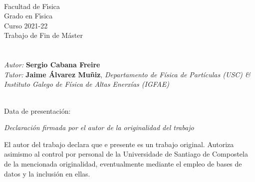 \documentclass[12 pt, a4paper]{article} %
\numberwithin{equation}{section}
\numberwithin{figure}{section}
\begin{document}
	
	
	\mbox{}
	\mbox{}\hfill{\large \DataDefensa} \vspace{1cm}
	\begin{center}
	\end{center}
	
	
	\clearpage
	\mbox{}
	\clearpage %
	
	
	\mbox{}\\
	Facultad de F\'{\i}sica\\
	Grado en F\'{\i}sica \\  
	Curso 2021-22\\%
	{\sc Trabajo de Fin de Máster}\vspace{3cm}\\
	{\sc\LARGE \TituloDoTraballo}\vspace{1cm}\\
	{\sl\large \EspecialidadeMaster}\vspace{2cm}\\
	{\sl Autor:} {\bf Sergio Cabana Freire}\\ %
	{\sl Tutor:} {\bf Jaime Álvarez Muñiz}, {\sl Departamento de Física de Partículas (USC) \& Instituto Galego de Física de Altas Enerxías (IGFAE)}\\
	\vspace{1cm}\\
	
	\mbox{}
	
	\mbox{}\hfill{Data de presentaci\'on: \DataDefensa}
	
	
	\clearpage
	
	\thispagestyle{empty}
	\pagebreak
	
	{\sl Declaraci\'on firmada por el autor de la originalidad del trabajo}
	
	El autor del trabajo declara que e presente es un trabajo original. Autoriza asimismo al control por personal de la Universidade de Santiago de Compostela de la mencionada originalidad, eventualmente mediante el empleo de bases de datos y la inclusi\'on en ellas.
	
\end{document}
